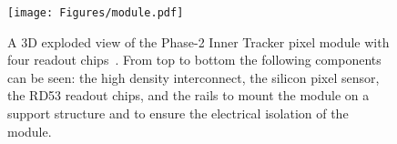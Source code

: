 \begin{figure}[!ht]
    \centering
    \texttt{[image: Figures/module.pdf]}
    \caption{A 3D exploded view of the Phase-2 Inner Tracker pixel module with four readout chips~\citep{bane_module}. From top to bottom the following components can be seen: the high density interconnect, the silicon pixel sensor, the RD53 readout chips, and the rails to mount the module on a support structure and to ensure the electrical isolation of the module.}
    \label{fig:module}
\end{figure}